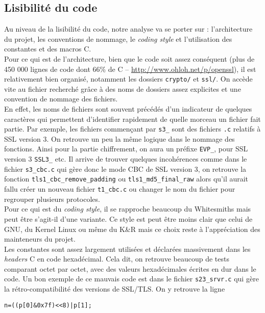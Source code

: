 \subsection{Lisibilité du code}
Au niveau de la lisibilité du code, notre analyse va se porter sur : l'architecture du projet, les conventions de nommage, le \textit{coding style} et l'utilisation des constantes et des macros C.\\


Pour ce qui est de l'architecture, bien que le code soit assez conséquent (plus de 450 000 lignes de code dont 66\% de C -- \url{http://www.ohloh.net/p/openssl}), il est relativement bien organisé, notamment les dossiers \verb+crypto/+ et \verb+ssl/+. On accède vite au fichier recherché grâce à des noms de dossiers assez explicites et une convention de nommage des fichiers.\\


En effet, les noms de fichiers sont souvent précédés d'un indicateur de quelques caractères qui permettent d'identifier rapidement de quelle morceau un fichier fait partie. Par exemple, les fichiers commençant par \verb+s3_+ sont des fichiers \verb+.c+ relatifs à SSL version 3. On retrouve un peu la même logique dans le nommage des fonctions. Ainsi pour la partie chiffrement, on aura un préfixe \verb+EVP_+, pour SSL version 3 \verb+SSL3_+ etc. Il arrive de trouver quelques incohérences comme dans le fichier \verb+s3_cbc.c+ qui gère donc le mode CBC de SSL version 3, on retrouve la fonction \verb+tls1_cbc_remove_padding+ ou \verb+tls1_md5_final_raw+ alors qu'il aurait fallu créer un nouveau fichier \verb+t1_cbc.c+ ou changer le nom du fichier pour regrouper plusieurs protocoles.\\


Pour ce qui est du \textit{coding style}, il se rapproche beaucoup du Whitesmiths mais peut être s'agit-il d'une variante. Ce style est peut être moins clair que celui de GNU, du Kernel Linux ou même du K\&R mais ce choix reste à l'appréciation des mainteneurs du projet.\\


Les constantes sont assez largement utilisées et déclarées massivement dans les \textit{headers} C en code hexadécimal. Cela dit, on retrouve beaucoup de tests comparant octet par octet, avec des valeurs hexadécimales écrites en dur dans le code. Un bon exemple de ce mauvais code est dans le fichier \verb+s23_srvr.c+ qui gère la rétro-compatibilité des versions de SSL/TLS. On y retrouve la ligne 
\begin{lstlisting}[style=customc,label=badcode, caption=Exemple de mauvais code d'OpenSSL]
n=((p[0]&0x7f)<<8)|p[1];
\end{lstlisting}

